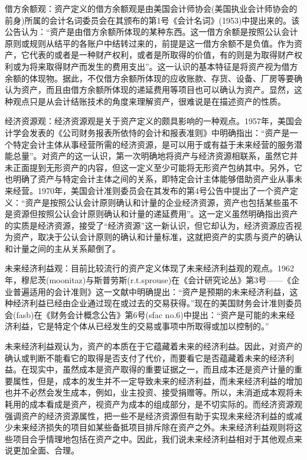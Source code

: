     借方余额观：资产定义的借方余额观是由美国会计师协会(美国执业会计师协会的前身)所属的会计名词委员会在其颁布的第1号《会计名词》(1953)中提出来的。该公告认为：“资产是由借方余额所体现的某种东西。这一借方余额是按照公认会计原则或规则从结平的各账户中结转过来的，前提是这一借方余额不是负值。作为资产，它代表的或者是一种财产权利，或者是所取得的价值，有的则是为取得财产权利或为将来取得财产而发生的费用支出”。这一认识的基本特征是将资产视为借方余额的体现物。据此，不仅借方余额所体现的应收账款、存货、设备、厂房等要确认为资产，而且由借方余额所体现的递延费用等项目也可以确认为资产。显然，这种观点只是从会计结账技术的角度来理解资产，很难说是在描述资产的性质。

    经济资源观：经济资源观是关于资产定义的颇具影响的一种观点。1957年，美国会计学会发表的《公司财务报表所依恃的会计和报表准则》中明确指出：“资产是一个特定会计主体从事经营所需的经济资源，是可以用于或有益于未来经营的服务潜能总量”。对资产的这一认识，第一次明确地将资产与经济资源相联系，虽然它并未正面提到无形资产的内容，但这一定义至少可能将无形资产包纳其中。另外，它也明确了资产与特定会计主体之间的关系，即特定会计主体能够借助资产业从事未来经营。1970年，美国会计准则委员会在其发布的第4号公告中提出了一个资产定义：“资产是按照公认会计原则确认和计量的企业经济资源，资产也包括某些虽不是资源但按照公认会计原则确认和计量的递延费用”。这一定义虽然明确指出资产的实质是经济资源，接受了“经济资源”这一新认识，但它却认为，经济资源应否视为资产，取决于公认会计原则的确认和计量标准，这就把资产的实质与资产的确认和计量之间的主从关系颠倒了。

    未来经济利益观：目前比较流行的资产定义体现了未来经济利益观的观点。1962年，穆尼茨(moonitaz)与斯普劳斯(r.t.sprouse)在《会计研究论丛》第3号——《企业普遍适用的会计准则》这一文献中明确提出：“资产是预期的未来经济利益，这种经济利益已经由企业通过现在或过去的交易获得。”现在的美国财务会计准则委员会(fasb)在《财务会计概念公告》第6号(sfac no.6)中提出：“资产是可能的未来经济利益，它是特定个体从已经发生的交易或事项中所取得或加以控制的。”

    未来经济利益观认为，资产的本质在于它蕴藏着未来的经济利益。因此，对资产的确认或判断不能看它的取得是否支付了代价，而要看它是否蕴藏着未来的经济利益。在现实中，虽然成本是资产取得的重要证据之一，而且成本还是资产计量的重要属性，但是，成本的发生并不一定导致未来的经济利益，而未来经济利益的增加也并不必然会发生成本，例如，业主投资、接受捐赠等。所以，未消逝成本观将未耗用的成本看成是资产，视资产为成本的组成部分，是不切实际的。而经济资源观强调资产的经济资源属性，把一些不是经济资源但有助于实现未来经济利益的或减少未来经济损失的项目如某些备抵项目排斥除在资产之外。未来经济利益观则将这些项目合乎情理地包括在资产之中。因此，我们说未来经济利益相对于其他观点来说更加全面、合理。
